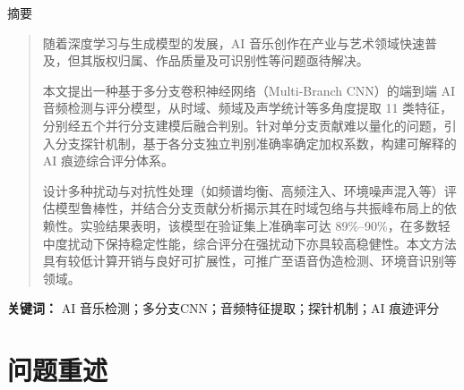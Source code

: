 \documentclass[aspectratio=169]{beamer}
\begin{document}
\begin{frame}{摘要}
\small

\vspace{1cm}

\begin{abstract}
随着深度学习与生成模型的发展，AI 音乐创作在产业与艺术领域快速普及，但其版权归属、作品质量及可识别性等问题亟待解决。

本文提出一种基于多分支卷积神经网络（Multi-Branch CNN）的端到端 AI 音频检测与评分模型，从时域、频域及声学统计等多角度提取 11 类特征，分别经五个并行分支建模后融合判别。针对单分支贡献难以量化的问题，引入分支探针机制，基于各分支独立判别准确率确定加权系数，构建可解释的 AI 痕迹综合评分体系。

设计多种扰动与对抗性处理（如频谱均衡、高频注入、环境噪声混入等）评估模型鲁棒性，并结合分支贡献分析揭示其在时域包络与共振峰布局上的依赖性。实验结果表明，该模型在验证集上准确率可达 89\%–90\%，在多数轻中度扰动下保持稳定性能，综合评分在强扰动下亦具较高稳健性。本文方法具有较低计算开销与良好可扩展性，可推广至语音伪造检测、环境音识别等领域。
\end{abstract}

\vspace{0.5em}
\noindent\textbf{关键词：} AI 音乐检测；多分支CNN；音频特征提取；探针机制；AI 痕迹评分

\end{frame}


\section{问题重述}
\end{document}
